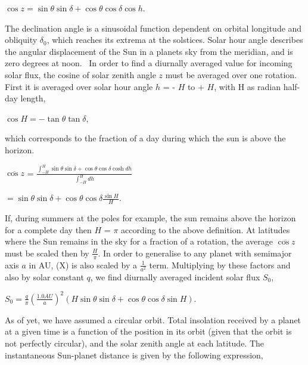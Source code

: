\documentclass[12pt,onecolumn]{revtex4-2}    %
\begin{document}
\begin{center}
$\cos z = \sin \theta \sin \delta + \cos \theta \cos \delta \cos h.$
\end{center}

The declination angle is a sinusoidal function dependent on orbital longitude and obliquity $\delta_{0}$, which reaches its extrema at the solstices. Solar hour angle describes the angular displacement of the Sun in a planets sky from the meridian, and is zero degrees at noon. 
\
In order to find a diurnally averaged value for incoming solar flux, the cosine of solar zenith angle $z$ must be averaged over one rotation. First it is averaged over solar hour angle $h$ = - $H$ to + $H$, with H as radian half-day length,

\begin{center}
$\cos H = -\tan \theta \tan \delta$,
\end{center}

which corresponds to the fraction of a day during which the sun is above the horizon. 
\begin{center}
$\overline{\cos z}$ = $\frac{\int_{-H}^{H} \sin\theta \sin\delta + \cos\theta \cos\delta \cosh dh}{\int_{-H}^{H} dh}$

$= \sin\theta \sin \delta + \cos\theta \cos\delta \frac{\sin H}{H}$.
\end{center}

If, during summers at the poles for example, the sun remains above the horizon for a complete day then $H$ = $\pi$ according to the above definition. At latitudes where the Sun remains in the sky for a fraction of a rotation, the average $\overline{\cos z}$ must be scaled then by $\frac{H}{\pi}$. In order to generalise to any planet with semimajor axis $a$ in AU, (X) is also scaled by a $\frac{1}{a^{2}}$ term. Multiplying by these factors and also by solar constant $q$, we find diurnally averaged incident solar flux $S_{0}$,

\begin{center}
$S_{0} = \frac{q}{\pi}(\frac{1.0 AU}{a})^{2}(H\sin \theta \sin \delta + \cos \theta \cos \delta \sin H)$.
\end{center}

As of yet, we have assumed a circular orbit.
Total insolation received by a planet at a given time is a function of the position in its orbit (given that the orbit is not perfectly circular), and the solar zenith angle at each latitude. The instantaneous Sun-planet distance is given by the following expression,
\end{document}
